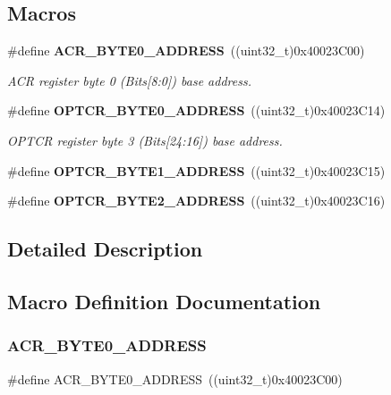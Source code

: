 \subsection*{Macros}
\begin{DoxyCompactItemize}
\item 
\#define \textbf{ A\+C\+R\+\_\+\+B\+Y\+T\+E0\+\_\+\+A\+D\+D\+R\+E\+SS}~((uint32\+\_\+t)0x40023\+C00)
\begin{DoxyCompactList}\small\item\em A\+CR register byte 0 (Bits[8\+:0]) base address. \end{DoxyCompactList}\item 
\#define \textbf{ O\+P\+T\+C\+R\+\_\+\+B\+Y\+T\+E0\+\_\+\+A\+D\+D\+R\+E\+SS}~((uint32\+\_\+t)0x40023\+C14)
\begin{DoxyCompactList}\small\item\em O\+P\+T\+CR register byte 3 (Bits[24\+:16]) base address. \end{DoxyCompactList}\item 
\#define \textbf{ O\+P\+T\+C\+R\+\_\+\+B\+Y\+T\+E1\+\_\+\+A\+D\+D\+R\+E\+SS}~((uint32\+\_\+t)0x40023\+C15)
\item 
\#define \textbf{ O\+P\+T\+C\+R\+\_\+\+B\+Y\+T\+E2\+\_\+\+A\+D\+D\+R\+E\+SS}~((uint32\+\_\+t)0x40023\+C16)
\end{DoxyCompactItemize}


\subsection{Detailed Description}


\subsection{Macro Definition Documentation}
\mbox{\label{group__FLASH__Exported__Constants_gaeaca61fbcff69df08100280868bff214}} 
\subsubsection{A\+C\+R\+\_\+\+B\+Y\+T\+E0\+\_\+\+A\+D\+D\+R\+E\+SS}
{\footnotesize\ttfamily \#define A\+C\+R\+\_\+\+B\+Y\+T\+E0\+\_\+\+A\+D\+D\+R\+E\+SS~((uint32\+\_\+t)0x40023\+C00)}



